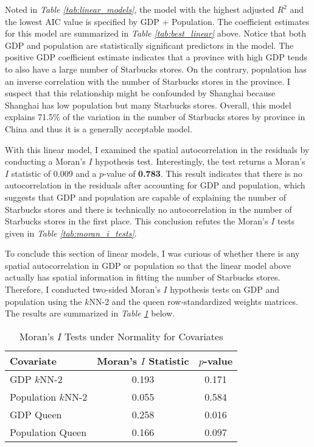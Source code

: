 \documentclass{article}
\begin{document}
Noted in \textit{Table \ref{tab:linear_models}}, the model with the highest adjusted \(R^2\) and the lowest AIC value is specified by GDP + Population. The coefficient estimates for this model are summarized in \textit{Table \ref{tab:best_linear}} above. Notice that both GDP and population are statistically significant predictors in the model. The positive GDP coefficient estimate indicates that a province with high GDP tends to also have a large number of Starbucks stores. On the contrary, population has an inverse correlation with the number of Starbucks stores in the province. I suspect that this relationship might be confounded by Shanghai because Shanghai has low population but many Starbucks stores. Overall, this model explains 71.5\% of the variation in the number of Starbucks stores by province in China and thus it is a generally acceptable model.

With this linear model, I examined the spatial autocorrelation in the residuals by conducting a Moran's \(I\) hypothesis test. Interestingly, the test returns a Moran's \(I\) statistic of 0.009 and a \(p\)-value of \textbf{0.783}. This result indicates that there is no autocorrelation in the residuals after accounting for GDP and population, which suggests that GDP and population are capable of explaining the number of Starbucks stores and there is technically no autocorrelation in the number of Starbucks stores in the first place. This conclusion refutes the Moran's \(I\) tests given in \textit{Table \ref{tab:moran_i_tests}}.

To conclude this section of linear models, I was curious of whether there is any spatial autocorrelation in GDP or population so that the linear model above actually has spatial information in fitting the number of Starbucks stores. Therefore, I conducted two-sided Moran's \(I\) hypothesis tests on GDP and population using the \(k\)NN-2 and the queen row-standardized weights matrices. The results are summarized in \textit{Table \ref{tab:moran_i_tests_covariates}} below.

\begin{table}[htbp]
    \centering
    \begin{tabular}{l c c}
        \toprule
        \textbf{Covariate} & \textbf{Moran's \(I\) Statistic} & \textbf{\(p\)-value} \\
        \midrule
        GDP \(k\)NN-2 & 0.193 & 0.171 \\
        Population \(k\)NN-2 & 0.055 & 0.584 \\
        GDP Queen & 0.258 & 0.016 \\
        Population Queen & 0.166 & 0.097 \\
        \bottomrule
    \end{tabular}
    \caption{Moran's \(I\) Tests under Normality for Covariates}
    \label{tab:moran_i_tests_covariates}
\end{table}
\end{document}
